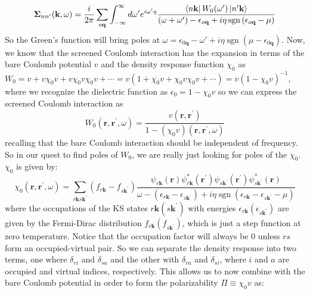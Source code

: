 \documentclass[12pt]{article}
\begin{document}
\begin{equation}
    \boldsymbol{\Sigma}_{n n^{\prime}}(\mathbf{k}, \omega) = \frac{i}{2 \pi} \sum_{o\mathbf{q}} \int_{-\infty}^{\infty} d \omega^{\prime} e^{i\omega ^{\prime}\eta } \frac{\bra{n\mathbf{k}}W_0(\omega^{\prime}) \ket{n^{\prime}\mathbf{k}}}{(\omega + \omega^{\prime}) - \epsilon_{o \mathbf{q}} + i \eta \operatorname{sgn}\left(\epsilon_{o \mathbf{q}}-\mu\right)}
\end{equation}
So the Green's function will bring poles at \(\omega = \epsilon_{0 \mathbf{q}} - \omega' + i\eta\operatorname{sgn}(\mu - \epsilon_{0 \mathbf{q}})\). Now, we know that the screened Coulomb interaction has the expansion in terms of the bare Coulomb potential \(v\) and the density response function \(\chi_0\) as \(W_0 = v + v\chi_0 v + v\chi_0 v\chi_0 v + \cdots = v\left(1 + \chi_0 v + \chi_0 v \chi_0 v + \cdots\right) = v\left(1 - \chi_0 v\right)^{-1}\), where we recognize the dielectric function as \(\epsilon_0 = 1 - \chi_0 v\) so we can express the screened Coulomb interaction as
\begin{equation}
   W_0(\mathbf{r}, \mathbf{r}^{\prime}, \omega) = \frac{v(\mathbf{r}, \mathbf{r}^{\prime})}{1 - \left(\chi_0v\right)(\mathbf{r}, \mathbf{r}^{\prime}, \omega)}
\end{equation}
recalling that the bare Coulomb interaction should be independent of frequency. So in our quest to find poles of $W_0$, we are really just looking for poles of the $\chi_0$. $\chi_0$ is given by:
\begin{equation}
\chi_{0}\left(\mathbf{r}, \mathbf{r}^{\prime}, \omega\right)=\sum_{r\mathbf{k} s \mathbf{k}^{\prime}}\left(f_{r \mathbf{k}}-f_{s \mathbf{k}^{\prime}}\right) \frac{\psi_{r \mathbf{k}}(\mathbf{r}) \psi_{r \mathbf{k}}^{*}\left(\mathbf{r}^{\prime}\right) \psi_{s \mathbf{k}^{\prime}}\left(\mathbf{r}^{\prime}\right) \psi_{s \mathbf{k}^{\prime}}^{*}(\mathbf{r})}{\omega-\left(\epsilon_{r \mathbf{k}}-\epsilon_{s \mathbf{k}^{\prime}}\right)+i \eta \operatorname{sgn}\left(\epsilon_{r \mathbf{k}}-\epsilon_{s \mathbf{k}^{\prime} } - \mu\right)}
\end{equation}
where the occupations of the KS states \(r\mathbf{k}(s\mathbf{k}^{\prime})\) with energies \(\epsilon_{r\mathbf{k}}(\epsilon_{s\mathbf{k}^{\prime}})\) are given by the Fermi-Dirac distribution \(f_{r\mathbf{k}}(f_{s\mathbf{k}^{\prime}})\), which is just a step function at zero temperature. Notice that the occupation factor will always be 0 unless \(rs\) form an occupied-virtual pair. So we can separate the density response into two terms, one where \(\delta_{ri}\) and \(\delta_{sa}\) and the other with \(\delta_{ra}\) and \(\delta_{si}\), where \(i\) and \(a\) are occupied and virtual indices, respectively. This allows us to now combine with the bare Coulomb potential in order to form the polarizability $\Pi\equiv \chi_0v$ as:
\end{document}
